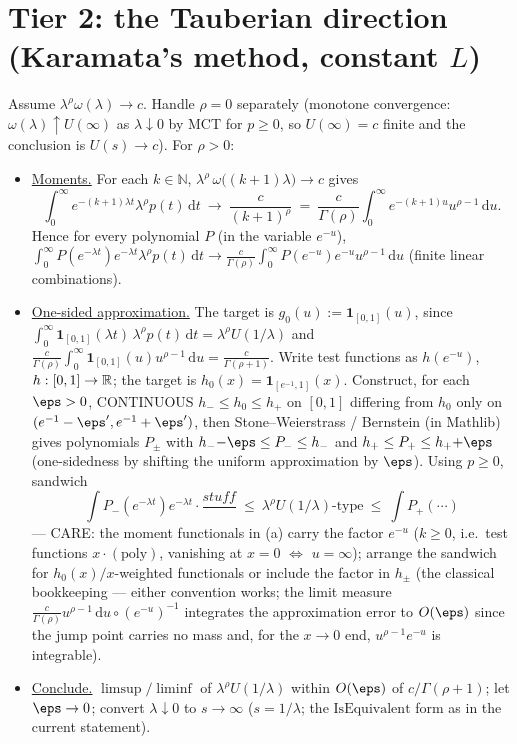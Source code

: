 \documentclass[11pt]{article}
\theoremstyle{plain}
\theoremstyle{remark}
\newcommand{\dd}{\,\mathrm d}
\begin{document}
\section*{Tier 2: the Tauberian direction (Karamata's method, constant $L$)}

Assume $\lambda^\rho\omega(\lambda)\to c$. Handle $\rho=0$ separately
(monotone convergence: $\omega(\lambda)\uparrow U(\infty)$ as
$\lambda\downarrow0$ by MCT for $p\ge0$, so $U(\infty)=c$ finite and the
conclusion is $U(s)\to c$). For $\rho>0$:
\begin{itemize}
\item[(a)] \underline{Moments.} For each $k\in\mathbb N$,
$\lambda^\rho\,\omega\big((k{+}1)\lambda\big)\to c$ gives
\[
  \int_0^\infty e^{-(k+1)\lambda t}\lambda^{\rho}p(t)\dd t
  \ \longrightarrow\ \frac{c}{(k+1)^{\rho}}
  \ =\ \frac c{\Gamma(\rho)}\int_0^\infty e^{-(k+1)u}u^{\rho-1}\dd u .
\]
Hence for every polynomial $P$ (in the variable $e^{-u}$),
$\int_0^\infty P(e^{-\lambda t})e^{-\lambda t}\lambda^{\rho}p(t)\dd t\to
\frac c{\Gamma(\rho)}\int_0^\infty P(e^{-u})e^{-u}u^{\rho-1}\dd u$
(finite linear combinations).
\item[(b)] \underline{One-sided approximation.} The target is
$g_0(u):=\mathbf 1_{[0,1]}(u)$, since
$\int_0^\infty\mathbf 1_{[0,1]}(\lambda t)\,\lambda^\rho p(t)\dd t
=\lambda^\rho U(1/\lambda)$ and
$\frac c{\Gamma(\rho)}\int_0^\infty\mathbf 1_{[0,1]}(u)u^{\rho-1}\dd u
=\frac c{\Gamma(\rho+1)}$. Write test functions as $h(e^{-u})$,
$h:[0,1]\to\mathbb{R}$; the target is $h_0(x)=\mathbf 1_{[e^{-1},1]}(x)$. Construct,
for each $\eps>0$, CONTINUOUS $h_-\le h_0\le h_+$ on $[0,1]$ differing from
$h_0$ only on $(e^{-1}-\eps',e^{-1}+\eps')$, then Stone--Weierstrass /
Bernstein (in Mathlib) gives polynomials $P_\pm$ with
$h_-{-}\eps\le P_-\le h_-$ and $h_+\le P_+\le h_+{+}\eps$
(one-sidedness by shifting the uniform approximation by $\eps$). Using
$p\ge0$, sandwich
\[
  \int P_-(e^{-\lambda t})e^{-\lambda t}\cdot\frac{stuff}{}\ \le\
  \lambda^\rho U(1/\lambda)\text{-type}\ \le\ \int P_+(\cdots)
\]
--- CARE: the moment functionals in (a) carry the factor $e^{-u}$ ($k\ge0$,
i.e.\ test functions $x\cdot(\text{poly})$, vanishing at $x{=}0$
$\Leftrightarrow$ $u{=}\infty$); arrange the sandwich for
$h_0(x)/x$-weighted functionals or include the factor in $h_\pm$
(the classical bookkeeping --- either convention works; the limit measure
$\frac c{\Gamma(\rho)}u^{\rho-1}\dd u\circ(e^{-u})^{-1}$ integrates the
approximation error to $O(\eps)$ since the jump point carries no mass and,
for the $x\to0$ end, $u^{\rho-1}e^{-u}$ is integrable).
\item[(c)] \underline{Conclude.} $\limsup/\liminf$ of
$\lambda^\rho U(1/\lambda)$ within $O(\eps)$ of $c/\Gamma(\rho+1)$; let
$\eps\to0$; convert $\lambda\downarrow0$ to $s\to\infty$ ($s=1/\lambda$; the
$\mathrm{IsEquivalent}$ form as in the current statement).
\end{itemize}
\end{document}
